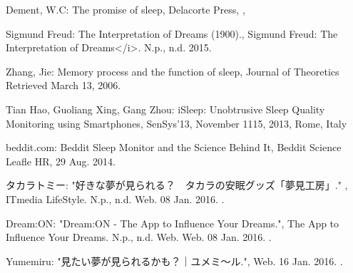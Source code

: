 \begin{bib}[100]
\begin{flushleft}
  Dement, W.C:
  \newblock  The promise of sleep,
  \newblock Delacorte Press,
  ,
 \end{flushleft}
 
\begin{flushleft}
  Sigmund Freud:
  \newblock The Interpretation of Dreams (1900).,
  \newblock Sigmund Freud: The Interpretation of Dreams</i>. N.p., n.d. 2015.
\end{flushleft}
 
\begin{flushleft}
 Zhang, Jie:
  \newblock Memory process and the function of sleep,
  \newblock Journal of Theoretics Retrieved March 13, 2006.
 \end{flushleft}
 
\begin{flushleft}
  Tian Hao, Guoliang Xing, Gang Zhou:
  \newblock  iSleep: Unobtrusive Sleep Quality Monitoring using Smartphones,
  \newblock SenSys’13,
  \newblock  November 1115, 2013, Rome, Italy
\end{flushleft}

\begin{flushleft}
  beddit.com:
  \newblock Beddit Sleep Monitor and the Science Behind It,
  \newblock Beddit Science Leafle HR, 29 Aug. 2014.
\end{flushleft}
  
\begin{flushleft}
  タカラトミー:
  \newblock "好きな夢が見られる？　タカラの安眠グッズ「夢見工房」." ,
  \newblock ITmedia LifeStyle. N.p., n.d.
  \newblock Web. 08 Jan. 2016.
  .
\end{flushleft}

\begin{flushleft}
  Dream:ON:
  \newblock "Dream:ON - The App to Influence Your Dreams.",
  \newblock The App to Influence Your Dreams. N.p., n.d. Web.
  \newblock Web. 08 Jan. 2016.
  .
\end{flushleft}

\begin{flushleft}
  Yumemiru:
  \newblock  "見たい夢が見られるかも？｜ユメミ〜ル.",
  \newblock Web. 16 Jan. 2016.
  .
\end{flushleft}


\end{bib}
